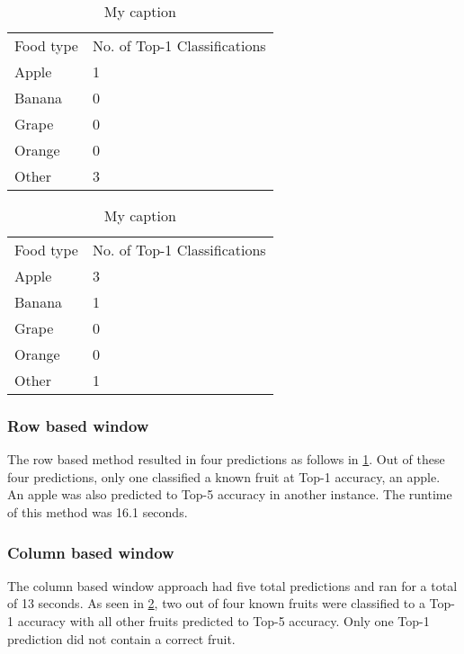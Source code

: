 \begin{table}[]
	\centering
	\caption{My caption}
	\label{rowWindowTable}
	\begin{tabular}{ll}
		Food type & No. of Top-1 Classifications \\
		Apple     & 1                      \\
		Banana    & 0                      \\
		Grape     & 0                      \\
		Orange    & 0                      \\
		Other     & 3                     
	\end{tabular}
\end{table}

\begin{table}[]
	\centering
	\caption{My caption}
	\label{colWindowTable}
	\begin{tabular}{ll}
		Food type & No. of Top-1 Classifications \\
		Apple     & 3                      \\
		Banana    & 1                      \\
		Grape     & 0                      \\
		Orange    & 0                      \\
		Other     & 1                     
	\end{tabular}
\end{table}

\subsubsection*{Row based window}
The row based method resulted in four predictions as follows in
\ref{rowWindowTable}. Out of these four predictions, only one classified a known
fruit at Top-1 accuracy, an apple. An apple was also predicted to Top-5 accuracy
in another instance. The runtime of this method was 16.1 seconds.

\subsubsection*{Column based window}
The column based window approach had five total predictions and ran for a total
of 13 seconds. As seen in \ref{colWindowTable}, two out of four known fruits
were classified to a Top-1 accuracy with all other fruits predicted to Top-5
accuracy. Only one Top-1 prediction did not contain a correct fruit.

